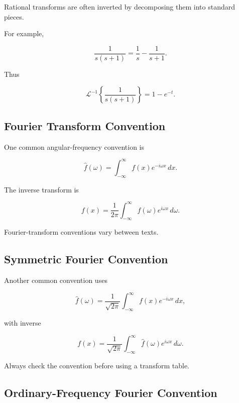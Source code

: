 Rational transforms are often inverted by decomposing them into standard
pieces.

For example,

\[
\frac{1}{s(s+1)}
=
\frac1s
-
\frac1{s+1}.
\]

Thus

\[
\boxed{
\mathcal{L}^{-1}
\left\{
\frac{1}{s(s+1)}
\right\}
=
1-e^{-t}.
}
\]

\subsection{Fourier Transform Convention}
\label{subsec:fourier-transform-convention-reference}

One common angular-frequency convention is

\[
\boxed{
\widehat{f}(\omega)
=
\int_{-\infty}^{\infty}
f(x)e^{-i\omega x}
\,dx.
}
\]

The inverse transform is

\[
\boxed{
f(x)
=
\frac{1}{2\pi}
\int_{-\infty}^{\infty}
\widehat{f}(\omega)
e^{i\omega x}
\,d\omega.
}
\]

Fourier-transform conventions vary between texts.

\subsection{Symmetric Fourier Convention}
\label{subsec:symmetric-fourier-convention}

Another common convention uses

\[
\boxed{
\widehat{f}(\omega)
=
\frac{1}{\sqrt{2\pi}}
\int_{-\infty}^{\infty}
f(x)e^{-i\omega x}
\,dx,
}
\]

with inverse

\[
\boxed{
f(x)
=
\frac{1}{\sqrt{2\pi}}
\int_{-\infty}^{\infty}
\widehat{f}(\omega)
e^{i\omega x}
\,d\omega.
}
\]

Always check the convention before using a transform table.

\subsection{Ordinary-Frequency Fourier Convention}
\label{subsec:ordinary-frequency-fourier}

